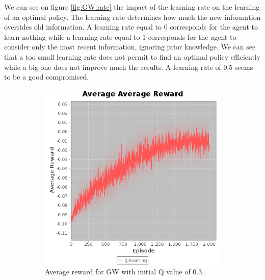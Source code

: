 \documentclass[10pt, twocolumn]{article}
\begin{document}
			We can see on figure \ref{fig:GW:rate} the impact of the learning rate on the learning of an optimal policy. The learning rate determines how much the new information overrides old information. A learning rate equal to 0 corresponds for the agent to learn nothing while a learning rate equal to 1 corresponds for the agent to consider only the most recent information, ignoring prior knowledge. We can see that a too small learning rate does not permit to find an optimal policy efficiently while a big one does not improve much the results. A learning rate of 0.5 seems to be a good compromised.

			\begin{figure}[]
				\centering
				\begin{subfigure}[t]{0.24\textwidth}
					\centering
					\includegraphics[width=\textwidth]{../graphics/GridWorld_0.3_Q_reward.png}
					\caption{Average reward for GW with initial Q value of 0.3.}
					\label{fig:GW:qinit1}
				\end{subfigure}
				\begin{subfigure}[t]{0.24\textwidth}
					\centering

\end{subfigure}
\end{figure}
\end{document}
